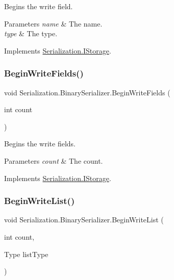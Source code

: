 Begins the write field. 


\begin{DoxyParams}{Parameters}
{\em name} & The name.\\
\hline
{\em type} & The type.\\
\hline
\end{DoxyParams}


Implements \hyperlink{interface_serialization_1_1_i_storage_a70f3334f87463abfe43c5d256c2486fe}{Serialization.\+I\+Storage}.

\mbox{\label{class_serialization_1_1_binary_serializer_a40709bdcdae381b2138a48e005e96ab2}} 
\subsubsection{\texorpdfstring{Begin\+Write\+Fields()}{BeginWriteFields()}}
{\footnotesize\ttfamily void Serialization.\+Binary\+Serializer.\+Begin\+Write\+Fields (\begin{DoxyParamCaption}\item[{int}]{count }\end{DoxyParamCaption})\hspace{0.3cm}{\ttfamily [inline]}}



Begins the write fields. 


\begin{DoxyParams}{Parameters}
{\em count} & The count.\\
\hline
\end{DoxyParams}


Implements \hyperlink{interface_serialization_1_1_i_storage_a101b3acfd63c956c27cd9d45e2c4d7c1}{Serialization.\+I\+Storage}.

\mbox{\label{class_serialization_1_1_binary_serializer_a70c5b0751ea84a7db8cb2b4a89576db3}} 
\subsubsection{\texorpdfstring{Begin\+Write\+List()}{BeginWriteList()}}
{\footnotesize\ttfamily void Serialization.\+Binary\+Serializer.\+Begin\+Write\+List (\begin{DoxyParamCaption}\item[{int}]{count,  }\item[{Type}]{list\+Type }\end{DoxyParamCaption})\hspace{0.3cm}{\ttfamily [inline]}}



